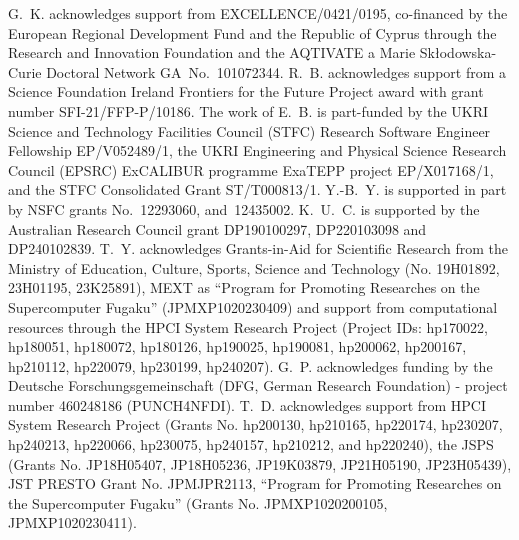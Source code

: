 \documentclass[a4paper,11pt]{article}
\begin{document}
\acknowledgments G.~K. acknowledges support from EXCELLENCE/0421/0195,
co-financed by the European Regional Development Fund and the Republic
of Cyprus through the Research and Innovation Foundation and the
AQTIVATE a Marie Sk\l{}odowska-Curie Doctoral Network
GA~No.~101072344.  R.~B. acknowledges support from a Science
Foundation Ireland Frontiers for the Future Project award with grant
number SFI-21/FFP-P/10186. The work of E.~B. is part-funded by the
UKRI Science and Technology Facilities Council (STFC) Research
Software Engineer Fellowship EP/V052489/1, the UKRI Engineering and
Physical Science Research Council (EPSRC) ExCALIBUR programme ExaTEPP
project EP/X017168/1, and the STFC Consolidated Grant
ST/T000813/1. Y.-B.~Y. is supported in part by NSFC grants
No.~12293060, and~12435002. K.~U.~C. is supported by the Australian
Research Council grant DP190100297, DP220103098 and DP240102839. T.~Y.
acknowledges Grants-in-Aid for Scientific Research from the Ministry
of Education, Culture, Sports, Science and Technology (No. 19H01892,
23H01195, 23K25891), MEXT as ``Program for Promoting Researches on the
Supercomputer Fugaku'' (JPMXP1020230409) and support from
computational resources through the HPCI System Research Project
(Project IDs: hp170022, hp180051, hp180072, hp180126, hp190025,
hp190081, hp200062, hp200167, hp210112, hp220079, hp230199,
hp240207). G.~P. acknowledges funding by the Deutsche
Forschungsgemeinschaft (DFG, German Research Foundation) - project
number 460248186 (PUNCH4NFDI). T.~D. acknowledges support from HPCI
System Research Project (Grants No. hp200130, hp210165, hp220174,
hp230207, hp240213, hp220066, hp230075, hp240157, hp210212, and
hp220240), the JSPS (Grants No. JP18H05407, JP18H05236, JP19K03879,
JP21H05190, JP23H05439), JST PRESTO Grant No. JPMJPR2113, ``Program
for Promoting Researches on the Supercomputer Fugaku'' (Grants
No. JPMXP1020200105, JPMXP1020230411).
\end{document}
